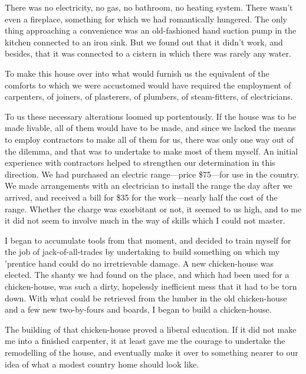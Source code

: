 \documentclass{book}
\begin{document}
There was no electricity, no gas, no bathroom, no heating system. There wasn’t even a fireplace, something for which we had romantically hungered. The only thing approaching a convenience was an old-fashioned hand suction pump in the kitchen connected to an iron sink. But we found out that it didn’t work, and besides, that it was connected to a cistern in which there was rarely any water.

To make this house over into what would furnish us the equivalent of the comforts to which we were accustomed would have required the employment of carpenters, of joiners, of plasterers, of plumbers, of steam-fitters, of electricians.

To us these necessary alterations loomed up portentously. If the house was to be made livable, all of them would have to be made, and since we lacked the means to employ contractors to make all of them for us, there was only one way out of the dilemma, and that was to undertake to make most of them myself. An initial experience with contractors helped to strengthen our determination in this direction. We had purchased an electric range—price \$75—for use in the country. We made arrangements with an electrician to install the range the day after we arrived, and received a bill for \$35 for the work—nearly half the cost of the range. Whether the charge was exorbitant or not, it seemed to us high, and to me it did not seem to involve much in the way of skills which I could not master.

I began to accumulate tools from that moment, and decided to train myself for the job of jack-of-all-trades by undertaking to build something on which my ’prentice hand could do no irretrievable damage. A new chicken-house was elected. The shanty we had found on the place, and which had been used for a chicken-house, was such a dirty, hopelessly inefficient mess that it had to be torn down. With what could be retrieved from the lumber in the old chicken-house and a few new two-by-fours and boards, I began to build a chicken-house.

The building of that chicken-house proved a liberal education. If it did not make me into a finished carpenter, it at least gave me the courage to undertake the remodelling of the house, and eventually make it over to something nearer to our idea of what a modest country home should look like.
\end{document}
